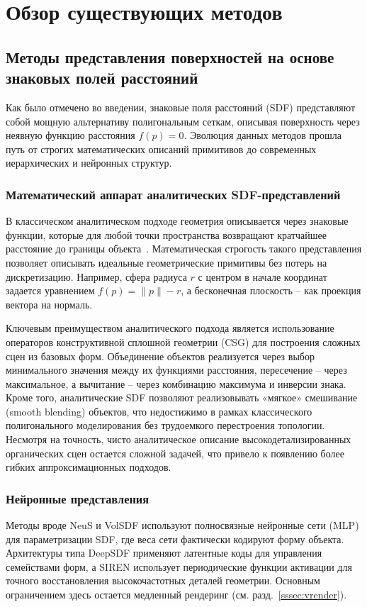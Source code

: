 \section{Обзор существующих методов}
\subsection{Методы представления поверхностей на основе знаковых полей расстояний}

Как было отмечено во введении, знаковые поля расстояний (SDF) представляют собой мощную альтернативу полигональным сеткам, описывая поверхность через неявную функцию расстояния $f(p) = 0$. Эволюция данных методов прошла путь от строгих математических описаний примитивов до современных иерархических и нейронных структур.

\subsubsection{Математический аппарат аналитических SDF-представлений} \label{sssec:analitical}
В классическом аналитическом подходе геометрия описывается через знаковые функции, которые для любой точки пространства возвращают кратчайшее расстояние до границы объекта~\cite[с.~749]{RTR4}. Математическая строгость такого представления позволяет описывать идеальные геометрические примитивы без потерь на дискретизацию. Например, сфера радиуса $r$ с центром в начале координат задается уравнением $f(p) = \|p\| - r$, а бесконечная плоскость -- как проекция вектора на нормаль.

Ключевым преимуществом аналитического подхода является использование операторов конструктивной сплошной геометрии (CSG) \cite{shapiro1991construction} для построения сложных сцен из базовых форм. Объединение объектов реализуется через выбор минимального значения между их функциями расстояния, пересечение -- через максимальное, а вычитание -- через комбинацию максимума и инверсии знака. Кроме того, аналитические SDF позволяют реализовывать «мягкое» смешивание (smooth blending) объектов, что недостижимо в рамках классического полигонального моделирования без трудоемкого перестроения топологии. Несмотря на точность, чисто аналитическое описание высокодетализированных органических сцен остается сложной задачей, что привело к появлению более гибких аппроксимационных подходов.

\subsubsection{Нейронные представления} \label{sssec:mlp}
Методы вроде NeuS \cite{wang2021neus} и VolSDF \cite{yariv2021volume} используют полносвязные нейронные сети (MLP) \cite{rumelhart1986learning} для параметризации SDF, где веса сети фактически кодируют форму объекта. Архитектуры типа DeepSDF \cite{park2019deepsdf} применяют латентные коды для управления семействами форм, а SIREN \cite{sitzmann2020implicit} использует периодические функции активации для точного восстановления высокочастотных деталей геометрии. Основным ограничением здесь остается медленный рендеринг (см. разд.~\ref{sssec:vrender}).

